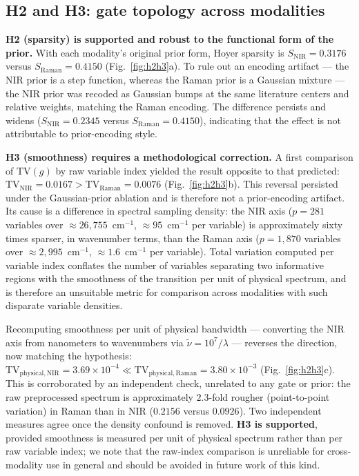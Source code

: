\documentclass[preprint,12pt]{elsarticle}
\begin{document}
\subsection{H2 and H3: gate topology across modalities}
\label{sec:results-h2h3}

\textbf{H2 (sparsity) is supported and robust to the functional form of the prior.} With each modality's original prior form, Hoyer sparsity is $S_{\mathrm{NIR}}=0.3176$ versus $S_{\mathrm{Raman}}=0.4150$ (Fig.~\ref{fig:h2h3}a). To rule out an encoding artifact --- the NIR prior is a step function, whereas the Raman prior is a Gaussian mixture --- the NIR prior was recoded as Gaussian bumps at the same literature centers and relative weights, matching the Raman encoding. The difference persists and widens ($S_{\mathrm{NIR}}=0.2345$ versus $S_{\mathrm{Raman}}=0.4150$), indicating that the effect is not attributable to prior-encoding style.

\textbf{H3 (smoothness) requires a methodological correction.} A first comparison of $\mathrm{TV}(g)$ by raw variable index yielded the result opposite to that predicted: $\mathrm{TV}_{\mathrm{NIR}}=0.0167 > \mathrm{TV}_{\mathrm{Raman}}=0.0076$ (Fig.~\ref{fig:h2h3}b). This reversal persisted under the Gaussian-prior ablation and is therefore not a prior-encoding artifact. Its cause is a difference in spectral sampling density: the NIR axis ($p=281$ variables over $\approx26{,}755$~cm$^{-1}$, $\approx95$~cm$^{-1}$ per variable) is approximately sixty times sparser, in wavenumber terms, than the Raman axis ($p=1{,}870$ variables over $\approx2{,}995$~cm$^{-1}$, $\approx1.6$~cm$^{-1}$ per variable). Total variation computed per variable index conflates the number of variables separating two informative regions with the smoothness of the transition per unit of physical spectrum, and is therefore an unsuitable metric for comparison across modalities with such disparate variable densities.

Recomputing smoothness per unit of physical bandwidth --- converting the NIR axis from nanometers to wavenumbers via $\tilde\nu=10^{7}/\lambda$ --- reverses the direction, now matching the hypothesis: $\mathrm{TV}_{\mathrm{physical,NIR}}=3.69\times10^{-4} \ll \mathrm{TV}_{\mathrm{physical,Raman}}=3.80\times10^{-3}$ (Fig.~\ref{fig:h2h3}c). This is corroborated by an independent check, unrelated to any gate or prior: the raw preprocessed spectrum is approximately $2.3$-fold rougher (point-to-point variation) in Raman than in NIR ($0.2156$ versus $0.0926$). Two independent measures agree once the density confound is removed. \textbf{H3 is supported}, provided smoothness is measured per unit of physical spectrum rather than per raw variable index; we note that the raw-index comparison is unreliable for cross-modality use in general and should be avoided in future work of this kind.
\end{document}
